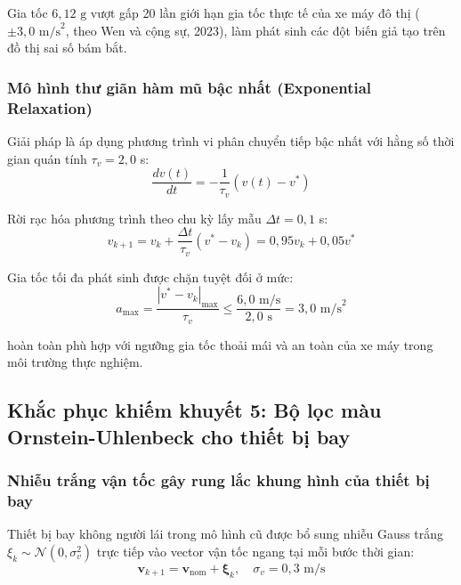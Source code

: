 Gia tốc $6{,}12\text{ g}$ vượt gấp 20 lần giới hạn gia tốc thực tế của xe máy đô thị ($\pm 3{,}0\text{ m/s}^2$, theo Wen và cộng sự, 2023), làm phát sinh các đột biến giả tạo trên đồ thị sai số bám bắt.

\subsubsection{Mô hình thư giãn hàm mũ bậc nhất (Exponential Relaxation)}

\hspace{0.5cm} Giải pháp là áp dụng phương trình vi phân chuyển tiếp bậc nhất với hằng số thời gian quán tính $\tau_v = 2{,}0$ s:
\begin{equation}
\frac{dv(t)}{dt} = -\frac{1}{\tau_v} (v(t) - v^*)
\label{eq:velocity-ode-relaxation}
\end{equation}

Rời rạc hóa phương trình theo chu kỳ lấy mẫu $\Delta t = 0{,}1$ s:
\begin{equation}
v_{k+1} = v_k + \frac{\Delta t}{\tau_v} (v^* - v_k) = 0{,}95 v_k + 0{,}05 v^*
\label{eq:discrete-velocity-relaxation}
\end{equation}

Gia tốc tối đa phát sinh được chặn tuyệt đối ở mức:
\begin{equation}
a_{\max} = \frac{|v^* - v_k|_{\max}}{\tau_v} \le \frac{6{,}0\text{ m/s}}{2{,}0\text{ s}} = 3{,}0\text{ m/s}^2
\label{eq:clamped-max-acceleration}
\end{equation}

hoàn toàn phù hợp với ngưỡng gia tốc thoải mái và an toàn của xe máy trong môi trường thực nghiệm.

\subsection{Khắc phục khiếm khuyết 5: Bộ lọc màu Ornstein-Uhlenbeck cho thiết bị bay}

\subsubsection{Nhiễu trắng vận tốc gây rung lắc khung hình của thiết bị bay}

\hspace{0.5cm} Thiết bị bay không người lái trong mô hình cũ được bổ sung nhiễu Gauss trắng $\xi_k \sim \mathcal{N}(0, \sigma_v^2)$ trực tiếp vào vector vận tốc ngang tại mỗi bước thời gian:
\begin{equation}
\mathbf{v}_{k+1} = \mathbf{v}_{\text{nom}} + \boldsymbol{\xi}_k, \quad \sigma_v = 0{,}3\text{ m/s}
\label{eq:white-noise-velocity-jitter}
\end{equation}

